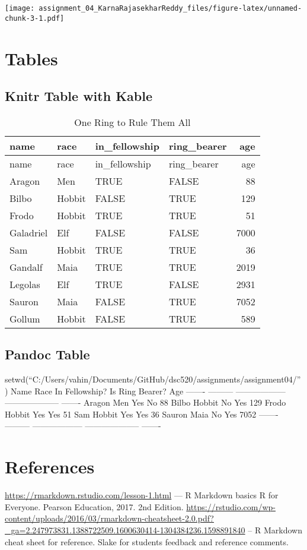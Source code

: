 \documentclass[
]{article}
\begin{document}
\texttt{[image: assignment\_04\_KarnaRajasekharReddy\_files/figure-latex/unnamed-chunk-3-1.pdf]}

\hypertarget{tables}{%
\section{Tables}\label{tables}}

\hypertarget{knitr-table-with-kable}{%
\subsection{Knitr Table with Kable}\label{knitr-table-with-kable}}

\begin{longtable}[]{@{}llllr@{}}
\caption{One Ring to Rule Them All}\tabularnewline
\toprule
name & race & in\_fellowship & ring\_bearer & age\tabularnewline
\midrule
\endfirsthead
\toprule
name & race & in\_fellowship & ring\_bearer & age\tabularnewline
\midrule
\endhead
Aragon & Men & TRUE & FALSE & 88\tabularnewline
Bilbo & Hobbit & FALSE & TRUE & 129\tabularnewline
Frodo & Hobbit & TRUE & TRUE & 51\tabularnewline
Galadriel & Elf & FALSE & FALSE & 7000\tabularnewline
Sam & Hobbit & TRUE & TRUE & 36\tabularnewline
Gandalf & Maia & TRUE & TRUE & 2019\tabularnewline
Legolas & Elf & TRUE & FALSE & 2931\tabularnewline
Sauron & Maia & FALSE & TRUE & 7052\tabularnewline
Gollum & Hobbit & FALSE & TRUE & 589\tabularnewline
\bottomrule
\end{longtable}

\hypertarget{pandoc-table}{%
\subsection{Pandoc Table}\label{pandoc-table}}

setwd(``C:/Users/vahin/Documents/GitHub/dsc520/assignments/assignment04/'')
Name Race In Fellowship? Is Ring Bearer? Age ------- ---------
------------------ -------------------- ------- Aragon Men Yes No 88
Bilbo Hobbit No Yes 129 Frodo Hobbit Yes Yes 51 Sam Hobbit Yes Yes 36
Sauron Maia No Yes 7052 ------- --------- ------------------
-------------------- -------

\hypertarget{references}{%
\section{References}\label{references}}

\url{https://rmarkdown.rstudio.com/lesson-1.html} --- R Markdown basics
R for Everyone. Pearson Education, 2017. 2nd Edition.
\url{https://rstudio.com/wp-content/uploads/2016/03/rmarkdown-cheatsheet-2.0.pdf?_ga=2.247973831.1388722509.1600630414-1304384236.1598891840}
-- R Markdown cheat sheet for reference. Slake for students feedback and
reference comments.
\end{document}
